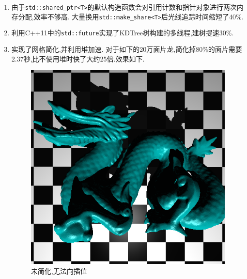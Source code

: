 \begin{enumerate}
\item 由于\verb|std::shared_ptr<T>|的默认构造函数会对引用计数和指针对象进行两次内存分配,效率不够高.
  大量换用\verb|std::make_share<T>|后光线追踪时间缩短了40\%.

  \item 利用C++11中的\verb|std::future|实现了KDTree树构建的多线程,建树提速30\%.

    \newpage
    \item 实现了网格简化,并利用堆加速. 对于如下的20万面片龙,简化掉80\%的面片需要2.37秒,比不使用堆时快了大约25倍.效果如下.
\begin{figure}[H]
\begin{minipage}[b]{0.46\linewidth}
  \centering
  \includegraphics[width=\textwidth]{res/unsimplified_nosmooth.png}
  \caption*{未简化,无法向插值}
\end{minipage}
\begin{minipage}[b]{0.46\linewidth}
  \centering

\end{minipage}
\end{figure}
\end{enumerate}
